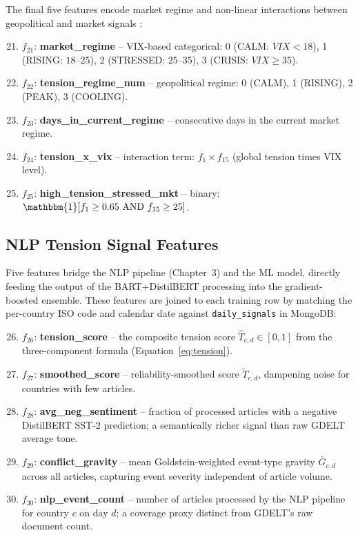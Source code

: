 \documentclass[12pt,a4paper]{report}
\begin{document}
The final five features encode market regime and non-linear interactions
between geopolitical and market signals \cite{friedman2001}:

\begin{enumerate}
  \setcounter{enumi}{20}
  \item $f_{21}$: \textbf{market\_regime} -- VIX-based categorical:
        0 (CALM: $VIX < 18$), 1 (RISING: $18$--$25$), 2 (STRESSED:
        $25$--$35$), 3 (CRISIS: $VIX \geq 35$).
  \item $f_{22}$: \textbf{tension\_regime\_num} -- geopolitical regime:
        0 (CALM), 1 (RISING), 2 (PEAK), 3 (COOLING).
  \item $f_{23}$: \textbf{days\_in\_current\_regime} -- consecutive days
        in the current market regime.
  \item $f_{24}$: \textbf{tension\_x\_vix} -- interaction term:
        $f_{1} \times f_{15}$ (global tension times VIX level).
  \item $f_{25}$: \textbf{high\_tension\_stressed\_mkt} -- binary:
        $\mathbbm{1}[f_{1} \geq 0.65 \text{ AND } f_{15} \geq 25]$.
\end{enumerate}

\subsection{NLP Tension Signal Features}

Five features bridge the NLP pipeline (Chapter~3) and the ML model, directly
feeding the output of the BART+DistilBERT processing into the gradient-boosted
ensemble.  These features are joined to each training row by matching the
per-country ISO code and calendar date against \texttt{daily\_signals} in
MongoDB:

\begin{enumerate}
  \setcounter{enumi}{25}
  \item $f_{26}$: \textbf{tension\_score} -- the composite tension score
        $\hat{T}_{c,d} \in [0,1]$ from the three-component formula
        (Equation~\ref{eq:tension}).
  \item $f_{27}$: \textbf{smoothed\_score} -- reliability-smoothed score
        $\tilde{T}_{c,d}$, dampening noise for countries with few articles.
  \item $f_{28}$: \textbf{avg\_neg\_sentiment} -- fraction of processed
        articles with a negative DistilBERT SST-2 prediction; a
        semantically richer signal than raw GDELT average tone.
  \item $f_{29}$: \textbf{conflict\_gravity} -- mean Goldstein-weighted
        event-type gravity $\bar{G}_{c,d}$ across all articles, capturing
        event severity independent of article volume.
  \item $f_{30}$: \textbf{nlp\_event\_count} -- number of articles
        processed by the NLP pipeline for country $c$ on day $d$;
        a coverage proxy distinct from GDELT's raw document count.
\end{enumerate}
\end{document}
